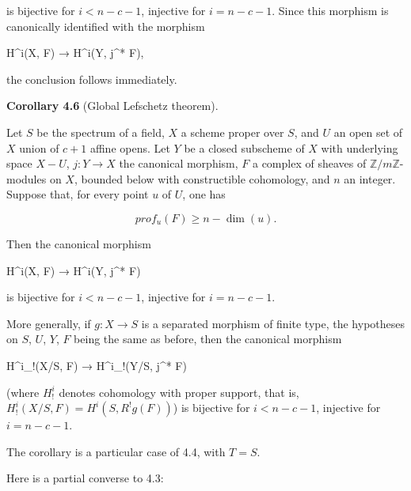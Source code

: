\documentclass[
  11pt,
  a4paper,
]{book}
\newenvironment{Shaded}{}{}
\newcommand{\NormalTok}[1]{#1}
\begin{document}
is bijective for \(i < n - c - 1\), injective for \(i = n - c - 1\).
Since this morphism is canonically identified with the morphism

\begin{Shaded}
\begin{Highlighting}[]
\NormalTok{H\^{}i(X, F) → H\^{}i(Y, j\^{}* F),}
\end{Highlighting}
\end{Shaded}

the conclusion follows immediately.

\textbf{Corollary 4.6} (Global Lefschetz theorem).

Let \(S\) be the spectrum of a field, \(X\) a scheme proper over \(S\),
and \(U\) an open set of \(X\) union of \(c + 1\) affine opens. Let
\(Y\) be a closed subscheme of \(X\) with underlying space \(X - U\),
\(j : Y \to X\) the canonical morphism, \(F\) a complex of sheaves of
\(\mathbb{Z}/m\mathbb{Z}\)-modules on \(X\), bounded below with
constructible cohomology, and \(n\) an integer. Suppose that, for every
point \(u\) of \(U\), one has

\[ prof_{u}(F) \geqslant n - \dim({u}). \]

Then the canonical morphism

\begin{Shaded}
\begin{Highlighting}[]
\NormalTok{H\^{}i(X, F) → H\^{}i(Y, j\^{}* F)}
\end{Highlighting}
\end{Shaded}

is bijective for \(i < n - c - 1\), injective for \(i = n - c - 1\).

More generally, if \(g : X \to S\) is a separated morphism of finite
type, the hypotheses on \(S\), \(U\), \(Y\), \(F\) being the same as
before, then the canonical morphism

\begin{Shaded}
\begin{Highlighting}[]
\NormalTok{H\^{}i\_!(X/S, F) → H\^{}i\_!(Y/S, j\^{}* F)}
\end{Highlighting}
\end{Shaded}

(where \(H^{i}_{!}\) denotes cohomology with proper support, that is,
\(H^{i}_{!}(X/S, F) = H^{i}(S, R^{!} g(F))\)) is bijective for
\(i < n - c - 1\), injective for \(i = n - c - 1\).

The corollary is a particular case of 4.4, with \(T = S\).

Here is a partial converse to 4.3:
\end{document}
